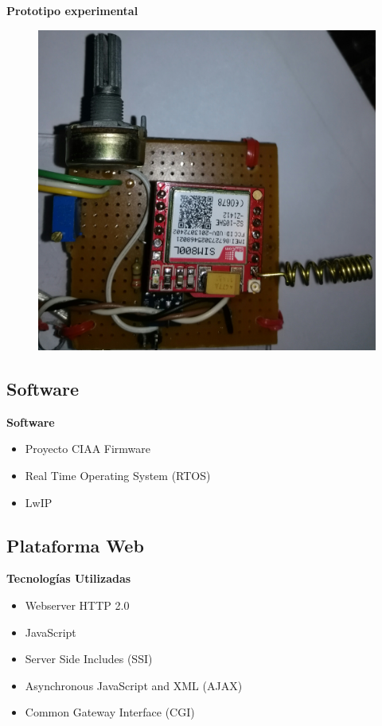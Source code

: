 \documentclass[11pt]{beamer}
\begin{document}
\begin{frame}{\textbf{\LARGE{Prototipo experimental}}}
  \vspace{-.7cm}
  \begin{figure}[H]
    {\includegraphics[width=.5\textwidth]{./imagenes/placa_basica.jpg}}
  \end{figure}	
\end{frame}

\subsection{Software}
\begin{frame}{\textbf{\LARGE{Software}}}
  \fontsize{18pt}{18}\selectfont
    \begin{itemize}
      \item Proyecto CIAA Firmware
      \vspace{15px}
      \item Real Time Operating System (RTOS)
      \vspace{15px}
      \item LwIP
    \end{itemize}

\end{frame}


\subsection{Plataforma Web}

\begin{frame}{\textbf{\LARGE{Tecnologías Utilizadas}}}
  \fontsize{18pt}{18}\selectfont
  \begin{itemize}
    \item Webserver HTTP 2.0
      \vspace{10px}
    \item JavaScript
      \vspace{10px}		
    \item Server Side Includes (SSI)
      \vspace{10px}
    \item Asynchronous JavaScript and XML (AJAX)
      \vspace{10px}
    \item Common Gateway Interface (CGI)
  \end{itemize}
\end{frame}
\end{document}
